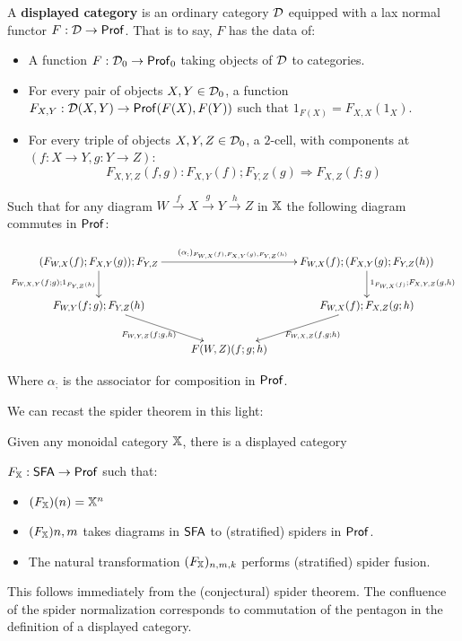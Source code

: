 \begin{definition}
A {\bf displayed category} is an ordinary category $\mathcal{D}$ equipped with a lax normal functor $F:\mathcal{D}\to {\sf Prof}$.
That is to say, $F$ has the data of:

\begin{itemize}
\item A function $F:\mathcal{D}_0\to {\sf Prof}_0$ taking objects of $\mathcal{D}$ to categories.
\item For every pair of objects $X,Y \in \mathcal{D}_0$, a function $F_{X,Y}:\mathcal{D}(X,Y)\to {\sf Prof}(F(X),F(Y))$  such that $1_{F(X)}=F_{X,X}(1_X)$.
\item For every triple of objects $X,Y,Z \in \mathcal{D}_0$, a $2$-cell, with components at $(f:X\to Y,g:Y\to Z)$:
$$F_{X,Y,Z}(f,g):F_{X,Y}(f);F_{Y,Z}(g) \Rightarrow F_{X,Z}(f;g)$$
\end{itemize}

Such that for any diagram $W\xrightarrow{f} X \xrightarrow{g} Y \xrightarrow{h} Z$ in $\mathbb{X}$ the following diagram commutes in ${\sf Prof}$:


$$
\xymatrix{
(F_{W,X}(f);F_{X,Y}(g));F_{Y,Z} \ar[d]_{F_{W,X,Y}(f;g);1_{F_{Y,Z}(h)}} \ar[rr]^{(\alpha_;)_{F_{W,X}(f),F_{X,Y}(g),F_{Y,Z}(h)}}
  & & F_{W,X}(f);(F_{X,Y}(g);F_{Y,Z}(h)) \ar[d]^{1_{F_{W,X}(f)};F_{X,Y,Z}(g,h)}\\
F_{W,Y}(f;g);F_{Y,Z}(h) \ar[dr]_{F_{W,Y,Z}(f;g,h) \ \ }
  && F_{W,X}(f);F_{X,Z}(g;h) \ar[dl]^{\ \ F_{W,X,Z}(f,g;h)}\\
  & F(W,Z)(f;g;h)
}
$$

Where $\alpha_;$ is the associator for composition in ${\sf Prof}$.
\end{definition}

We can recast the spider theorem in this light:

\begin{lemma}
Given any monoidal category $\mathbb{X}$, there is a displayed category

$F_{\mathbb{X}}:{\sf SFA}\to {\sf Prof}$ such that:
\begin{itemize}
\item $(F_{\mathbb{X}})(n) = \mathbb{X}^n$
\item $(F_{\mathbb{X}}){n,m}$ takes diagrams in ${\sf SFA}$ to (stratified) spiders in ${\sf Prof}$.
\item The natural transformation $(F_{\mathbb{X}})_{n,m,k}$ performs (stratified) spider fusion.
\end{itemize}


\end{lemma}

This follows immediately from the  (conjectural) spider theorem.
The confluence of the spider normalization corresponds to commutation of the pentagon in the definition of a displayed category.

